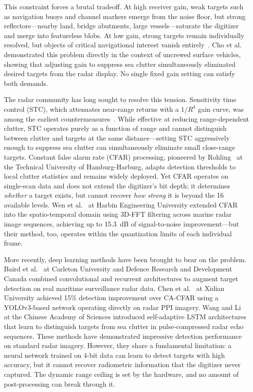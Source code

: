 \documentclass[twocolumn, 10pt]{article}
\begin{document}
This constraint forces a brutal tradeoff. At high receiver gain, weak targets such as navigation buoys and channel markers emerge from the noise floor, but strong reflectors---nearby land, bridge abutments, large vessels---saturate the digitizer and merge into featureless blobs. At low gain, strong targets remain individually resolved, but objects of critical navigational interest vanish entirely~\cite{Ward2013Marine}. Cho et al.~\cite{Cho2025AdaptiveSTC} demonstrated this problem directly in the context of uncrewed surface vehicles, showing that adjusting gain to suppress sea clutter simultaneously eliminated desired targets from the radar display. No single fixed gain setting can satisfy both demands.

The radar community has long sought to resolve this tension. Sensitivity time control (STC), which attenuates near-range returns with a $1/R^4$ gain curve, was among the earliest countermeasures~\cite{Watts2016STC}. While effective at reducing range-dependent clutter, STC operates purely as a function of range and cannot distinguish between clutter and targets at the same distance---setting STC aggressively enough to suppress sea clutter can simultaneously eliminate small close-range targets. Constant false alarm rate (CFAR) processing, pioneered by Rohling~\cite{Rohling1983CFAR} at the Technical University of Hamburg-Harburg, adapts detection thresholds to local clutter statistics and remains widely deployed. Yet CFAR operates on single-scan data and does not extend the digitizer's bit depth; it determines \textit{whether} a target exists, but cannot recover \textit{how strong} it is beyond the 16 available levels. Wen et al.~\cite{Wen2022SpatioTemporal} at Harbin Engineering University extended CFAR into the spatio-temporal domain using 3D-FFT filtering across marine radar image sequences, achieving up to 15.3~dB of signal-to-noise improvement---but their method, too, operates within the quantization limits of each individual frame.

More recently, deep learning methods have been brought to bear on the problem. Baird et al.~\cite{Baird2020CNNLSTM} at Carleton University and Defence Research and Development Canada combined convolutional and recurrent architectures to augment target detection on real maritime surveillance radar data. Chen et al.~\cite{Chen2021PPInet} at Xidian University achieved 15\% detection improvement over CA-CFAR using a YOLOv3-based network operating directly on radar PPI imagery. Wang and Li~\cite{Wang2023SALALSTM} at the Chinese Academy of Sciences introduced self-adaptive LSTM architectures that learn to distinguish targets from sea clutter in pulse-compressed radar echo sequences. These methods have demonstrated impressive detection performance on standard radar imagery. However, they share a fundamental limitation: a neural network trained on 4-bit data can learn to detect targets with high accuracy, but it cannot recover radiometric information that the digitizer never captured. The dynamic range ceiling is set by the hardware, and no amount of post-processing can break through it.
\end{document}

